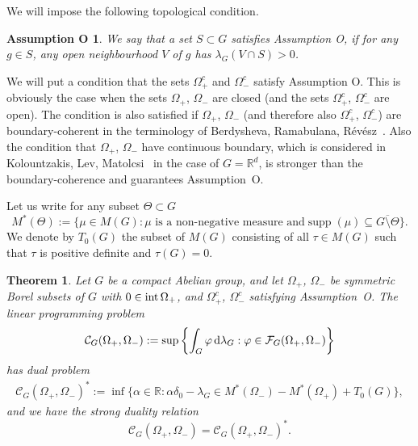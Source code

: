 \documentclass[[a4paper,english,12pt]{amsart}
\theoremstyle{plain}
\newtheorem{theorem}{Theorem}
\newtheorem*{assumption-o}{Assumption O}
\theoremstyle{remark}
\newcommand\supp{\operatorname{supp}}
\newcommand{\intt}{\mbox{\rm int\,}}
\newcommand{\RR}{\mathbb R}
\begin{document}
We will impose the following topological condition. 

\begin{assumption-o}

We say that a set $S \subset G$ satisfies \emph{Assumption O}, if for any $g \in S$, any open neighbourhood $V$ of $g$ has $ \lambda_G(V \cap S) > 0$.

\end{assumption-o}

We will put a condition that the sets $\Omega_+^c$ and $\Omega_-^c$ satisfy Assumption O. This is obviously the case when the sets $\Omega_+$, $\Omega_-$ are closed (and the sets $\Omega_+^c$, $\Omega_-^c$ are open). The condition is also satisfied if $\Omega_+$, $\Omega_-$ (and therefore also $\Omega_+^c$, $\Omega_-^c$) are boundary-coherent in the terminology of Berdysheva, Ramabulana, R\'ev\'esz~\cite{BRR_Expo}. Also the condition that $\Omega_+$, $\Omega_-$ have continuous boundary, which is considered in Kolountzakis, Lev, Matolcsi~\cite{KLM} in the case of $G = \RR^d$, is stronger than the boundary-coherence and guarantees Assumption~O.

Let us write for any subset $\Theta \subset G$ 
$$
M^*(\Theta):= \{ \mu \in M(G): \mu\text{ is a non-negative measure and
} \supp(\mu)\subseteq\overline{G\setminus\Theta} \}.
$$
We denote by $T_0(G)$ the subset of $M(G)$ consisting of all $\tau \in M(G)$ such that $\tau$ is positive definite and $\tau(G) = 0$.

\begin{theorem} \label{theorem:main_group}
Let $G$ be a compact Abelian group, and let $\Omega_+$, $\Omega_-$ be symmetric Borel subsets of $G$ with $0 \in \intt{\Omega_+}$, and $\Omega_+^c$, $\Omega_-^c$ satisfying Assumption~O. The linear programming problem 
\begin{equation*}
\mathcal{C}_G(\Omega_+, \Omega_-) := \sup \left\{ \int_G \varphi \,\textup{d}\lambda_G : \varphi \in \mathcal{F}_G(\Omega_+, \Omega_-) \right\}
\end{equation*}
has dual problem
\begin{align*}
\mathcal{C}_{G}(\Omega_+, \Omega_-)^{*}:=\inf \{ \alpha \in \RR : \alpha \delta_0 - \lambda_G \in  M^*(\Omega_-) - M^*(\Omega_+) + T_0(G)\},
\end{align*}
and we have the strong duality relation
\begin{equation*}
\mathcal{C}_G(\Omega_+, \Omega_-) = \mathcal{C}_G(\Omega_+, \Omega_-)^*.
\end{equation*}

\end{theorem}
\end{document}
